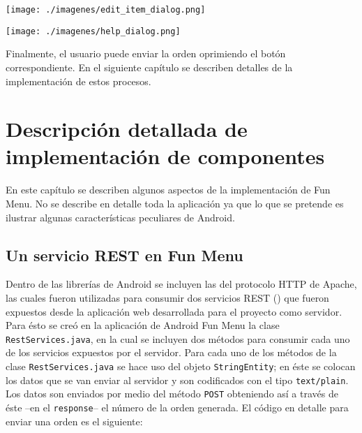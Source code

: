 \documentclass[letterpaper,12pt]{book}
\begin{document}
\begin{mainmatter}
\begin{center}
 \texttt{[image: ./imagenes/edit\_item\_dialog.png]}

\end{center}

\begin{center}
 \texttt{[image: ./imagenes/help\_dialog.png]}


\end{center}

Finalmente, el usuario puede enviar la orden oprimiendo el botón correspondiente. En el siguiente capítulo
se describen detalles de la implementación de estos procesos.

\chapter{Descripción detallada de implementación de componentes}

En este capítulo se describen algunos aspectos de la implementación de Fun Menu. No se describe
en detalle toda la aplicación ya que lo que se pretende es ilustrar algunas características peculiares de Android.

\section{Un servicio REST en Fun Menu}

Dentro de las librerías de  Android se incluyen las del protocolo HTTP
de Apache,  las cuales fueron  utilizadas para consumir  dos servicios
REST (\cite{rest}) que fueron expuestos desde la aplicación web desarrollada para el
proyecto como servidor. Para ésto  se creó en la aplicación de Android
Fun Menu la clase \texttt{RestServices.java}, en la cual se incluyen dos métodos para
consumir cada  uno de los  servicios expuestos por el  servidor.  Para
cada  uno de  los métodos  de la  clase \texttt{RestServices.java}  se hace  uso del
objeto \texttt{StringEntity}; en éste se colocan los datos que se van enviar al
servidor  y son  codificados con  el  tipo \texttt{text/plain}.  Los datos  son
enviados por medio del método \texttt{POST}  obteniendo así a través de éste --en
el \texttt{response}-- el número de la  orden generada. El código en detalle para
enviar una orden es el siguiente:



\lstset{language=Java, tabsize=2, showstringspaces=false}
\begin{scriptsize}
\begin{lstlisting}


\end{lstlisting}
\end{scriptsize}
\end{mainmatter}
\end{document}
